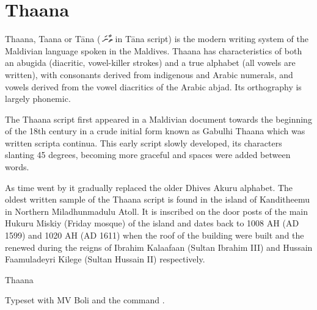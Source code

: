 \section{Thaana}

\newfontfamily{}
Thaana, Taana or Tāna ({\thaana  ތާނަ}‎ in Tāna script) is the modern writing system of the Maldivian language spoken in the Maldives. Thaana has characteristics of both an abugida (diacritic, vowel-killer strokes) and a true alphabet (all vowels are written), with consonants derived from indigenous and Arabic numerals, and vowels derived from the vowel diacritics of the Arabic abjad. Its orthography is largely phonemic.

The Thaana script first appeared in a Maldivian document towards the beginning of the 18th century in a crude initial form known as Gabulhi Thaana which was written scripta continua. This early script slowly developed, its characters slanting 45 degrees, becoming more graceful and spaces were added between words. 

As time went by it gradually replaced the older Dhives Akuru alphabet. The oldest written sample of the Thaana script is found in the island of Kanditheemu in Northern Miladhunmadulu Atoll. It is inscribed on the door posts of the main Hukuru Miskiy (Friday mosque) of the island and dates back to 1008 AH (AD 1599) and 1020 AH (AD 1611) when the roof of the building were built and the renewed during the reigns of Ibrahim Kalaafaan (Sultan Ibrahim III) and Hussain Faamuladeyri Kilege (Sultan Hussain II) respectively.

\begin{scriptexample}[]{Thaana}

\hfill Typeset with MV Boli and the command \cmd{\thaana}.
\end{scriptexample}


^^A
